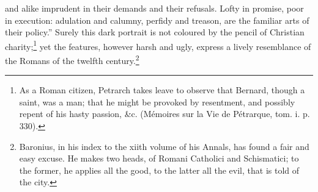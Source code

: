 and alike imprudent in their demands and their refusals. Lofty in promise, poor in execution: adulation and calumny, perfidy and treason, are the familiar arts of their policy.\texthebrew{}” Surely this dark portrait is not coloured by the pencil of Christian charity;\footnote{As a Roman citizen, Petrarch takes leave to observe that Bernard, though a saint, was a man; that he might be provoked by resentment, and possibly repent of his hasty passion, \&c. (Mémoires sur la Vie de Pétrarque, tom. i. p. 330).} yet the features, however harsh and ugly, express a lively resemblance of the Romans of the twelfth century.\footnote{Baronius, in his index to the xiith volume of his Annals, has found a fair and easy excuse. He makes two heads, of Romani Catholici and Schismatici; to the former, he applies all the good, to the latter all the evil, that is told of the city.}

